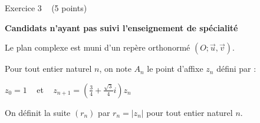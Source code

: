 
%
\begin{h2}Exercice 3   (5 points)\end{h2}
\textbf{Candidats n'ayant pas suivi l'enseignement de spécialité}
\par
Le plan complexe est muni d'un repère orthonormé $\left(O; \vec{u}, \vec{v}\right)$.
\par
Pour tout entier naturel $n$, on note $A_{n}$ le point d'affixe $z_{n}$ défini par :
\par
$z_{0}=1$     et    $ z_{n+1}=\left(\frac{3}{4}+\frac{\sqrt{3}}{4}i\right)z_{n}$
\par
On définit la suite $\left(r_{n}\right)$ par $r_{n}=|z_{n}|$ pour tout entier naturel $n$.
